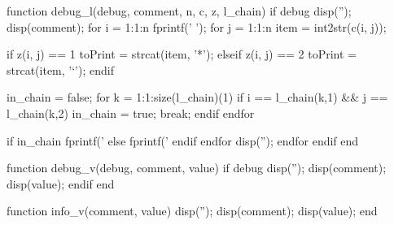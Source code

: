 function debug_l(debug, comment, n, c, z, l_chain)
  if debug
    disp('');
    disp(comment);
    for i = 1:1:n
      fprintf('  ');
      for j = 1:1:n
        item = int2str(c(i, j));

        if z(i, j) == 1
          toPrint = strcat(item, '*');
        elseif z(i, j) == 2
          toPrint = strcat(item, '`');
        endif

        in_chain = false;
        for k = 1:1:size(l_chain)(1)
          if i == l_chain(k,1) && j == l_chain(k,2)
            in_chain = true;
            break;
          endif
        endfor

        if in_chain
          fprintf('%
        else
          fprintf(' %
        endif
      endfor
      disp('');
    endfor
  endif
end

function debug_v(debug, comment, value)
  if debug
    disp('');
    disp(comment);
    disp(value);
  endif
end

function info_v(comment, value)
  disp('');
  disp(comment);
  disp(value);
end
